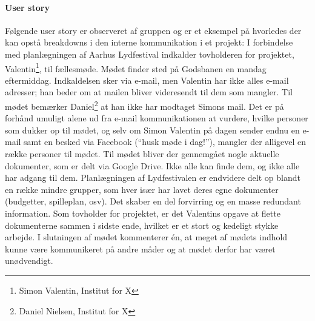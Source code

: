\paragraph{User story}
Følgende user story er observeret af gruppen og er et eksempel på hvorledes der kan opstå breakdowns i den interne kommunikation i et projekt:
I forbindelse med planlægningen af Aarhus Lydfestival indkalder tovholderen for projektet, Valentin\footnote{Simon Valentin, Institut for X}, til fællesmøde. Mødet finder sted på Godsbanen en mandag eftermiddag. Indkaldelsen sker via e-mail, men Valentin har ikke alles e-mail adresser; han beder om at mailen bliver videresendt til dem som mangler. Til mødet bemærker Daniel\footnote{Daniel Nielsen, Institut for X} at han ikke har modtaget Simons mail.
Det er på forhånd umuligt alene ud fra e-mail kommunikationen at vurdere, hvilke personer som dukker op til mødet, og selv om Simon Valentin på dagen sender endnu en e-mail samt en besked via Facebook (“husk møde i dag!”), mangler der alligevel en række personer til mødet.
Til mødet bliver der gennemgået nogle aktuelle dokumenter, som er delt via Google Drive. Ikke alle kan finde dem, og ikke alle har adgang til dem.
Planlægningen af Lydfestivalen er endvidere delt op blandt en række mindre grupper, som hver især har lavet deres egne dokumenter (budgetter, spilleplan, osv). Det skaber en del forvirring og en masse redundant information. Som tovholder for projektet, er det Valentins opgave at flette dokumenterne sammen i sidste ende, hvilket er et stort og kedeligt stykke arbejde.
I slutningen af mødet kommenterer én, at meget af mødets indhold kunne være kommunikeret på andre måder og at mødet derfor har været unødvendigt.
